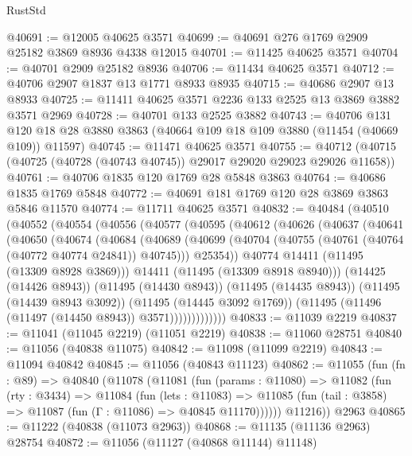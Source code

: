 \begin{lexlean}{RustStd}
\begin{coremodule}
@40691 := @12005 @40625 @3571
@40699 := @40691 @276 @1769 @2909 @25182 @3869 @8936 @4338 @12015
@40701 := @11425 @40625 @3571
@40704 := @40701 @2909 @25182 @8936
@40706 := @11434 @40625 @3571
@40712 := @40706 @2907 @1837 @13 @1771 @8933 @8935
@40715 := @40686 @2907 @13 @8933
@40725 := @11411 @40625 @3571 @2236 @133 @2525 @13 @3869 @3882 @3571 @2969
@40728 := @40701 @133 @2525 @3882
@40743 := @40706
    @131
    @120
    @18
    @28
    @3880
    @3863
    (@40664 @109 @18 @109 @3880 (@11454 (@40669 @109)) @11597)
@40745 := @11471 @40625 @3571
@40755 := @40712 (@40715 (@40725 (@40728 (@40743 @40745)) @29017 @29020 @29023 @29026 @11658))
@40761 := @40706 @1835 @120 @1769 @28 @5848 @3863
@40764 := @40686 @1835 @1769 @5848
@40772 := @40691 @181 @1769 @120 @28 @3869 @3863 @5846 @11570
@40774 := @11711 @40625 @3571
@40832 := @40484
    (@40510
      (@40552
        (@40554
          (@40556
            (@40577
              (@40595
                (@40612
                  (@40626
                    (@40637
                      (@40641
                        (@40650
                          (@40674
                            (@40684
                              (@40689
                                (@40699
                                  (@40704 (@40755 (@40761 (@40764 (@40772 @40774 @24841)) @40745)))
                                  @25354))
                              @40774
                              @14411
                              (@11495 (@13309 @8928 @3869)))
                            @14411
                            (@11495 (@13309 @8918 @8940)))
                          (@14425 (@14426 @8943))
                          (@11495 (@14430 @8943))
                          (@11495 (@14435 @8943))
                          (@11495 (@14439 @8943 @3092))
                          (@11495 (@14445 @3092 @1769))
                          (@11495 (@11496 (@11497 (@14450 @8943)) @3571)))))))))))))
@40833 := @11039 @2219
@40837 := @11041 (@11045 @2219) (@11051 @2219)
@40838 := @11060 @28751
@40840 := @11056 (@40838 @11075)
@40842 := @11098 (@11099 @2219)
@40843 := @11094 @40842
@40845 := @11056 (@40843 @11123)
@40862 := @11055
    (fun (fn : @89) =>
    @40840
      (@11078
        (@11081
          (fun (params : @11080) =>
          @11082
            (fun (rty : @3434) =>
            @11084
              (fun (lets : @11083) =>
              @11085 (fun (tail : @3858) => @11087 (fun (Γ : @11086) => @40845 @11170))))))
        @11216))
    @2963
@40865 := @11222 (@40838 (@11073 @2963))
@40868 := @11135 (@11136 @2963) @28754
@40872 := @11056 (@11127 (@40868 @11144) @11148)

\end{coremodule}
\end{lexlean}
